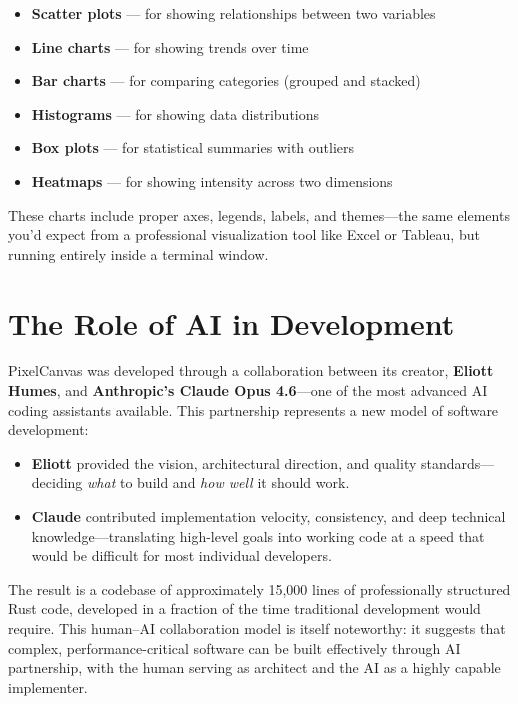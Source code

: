 \documentclass[12pt, a4paper]{article}
\begin{document}
\begin{itemize}[leftmargin=1.5em, itemsep=0.5em]
    \item \textbf{Scatter plots} --- for showing relationships between two variables
    \item \textbf{Line charts} --- for showing trends over time
    \item \textbf{Bar charts} --- for comparing categories (grouped and stacked)
    \item \textbf{Histograms} --- for showing data distributions
    \item \textbf{Box plots} --- for statistical summaries with outliers
    \item \textbf{Heatmaps} --- for showing intensity across two dimensions
\end{itemize}

These charts include proper axes, legends, labels, and themes---the same elements you'd expect from a professional visualization tool like Excel or Tableau, but running entirely inside a terminal window.

\section{The Role of AI in Development}

PixelCanvas was developed through a collaboration between its creator, \textbf{Eliott Humes}, and \textbf{Anthropic's Claude Opus 4.6}---one of the most advanced AI coding assistants available. This partnership represents a new model of software development:

\begin{itemize}[leftmargin=1.5em, itemsep=0.5em]
    \item \textbf{Eliott} provided the vision, architectural direction, and quality standards---deciding \emph{what} to build and \emph{how well} it should work.
    \item \textbf{Claude} contributed implementation velocity, consistency, and deep technical knowledge---translating high-level goals into working code at a speed that would be difficult for most individual developers.
\end{itemize}

The result is a codebase of approximately 15,000 lines of professionally structured Rust code, developed in a fraction of the time traditional development would require. This human--AI collaboration model is itself noteworthy: it suggests that complex, performance-critical software can be built effectively through AI partnership, with the human serving as architect and the AI as a highly capable implementer.
\end{document}
